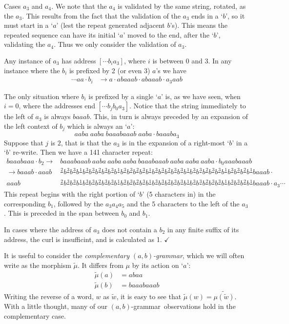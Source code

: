 \documentclass[11pt]{article}
\def\emph#1{{\em #1\/}}
\def\term#1{\emph{#1}}
\def\QED{$\checkmark$}
\def\ni{\noindent}
\def\s#1{\frac{#1}{}}
\def\ab{$(a,b)$}
\def\abg{\ab-grammar}
\def\rmu{\tilde{\mu}}
\def\q#1{`$#1$'}
\def\addr#1{$[#1]$}
\begin{document}
Cases $a_3$ and $a_4$. We note that the $a_4$ is validated by the same string, rotated, as the $a_3$.
This results from the fact that the validation of the $a_3$ ends in a \q{b}, so
it must start in a \q{a} (lest the repeat generated adjacent $b$'s).  This means
the repeated sequence can have its initial \q{a} moved to the end, after the
\q{b}, validating the $a_4$.  Thus we only consider the validation of $a_3$.

Any instance of $a_3$ has address \addr{\cdots b_ia_3}, where $i$ is between 0 and 3.  In any instance
where the $b_i$ is prefixed by 2 (or even 3) $a$'s we have
\begin{align*}
 \cdots aa\cdot b_i&\rightarrow a\cdot abaaab\cdot abaaab\cdot a_3aab
\end{align*}

The only situation where $b_i$ is prefixed by a single \q{a} is, as we have
seen, when $i=0$, where the addresses end \addr{\cdots b_jb_0a_3}.  Notice that the
string immediately to the left of $a_3$ is always $baaab$.  This, in turn is
always preceded by an expansion of the left context of $b_j$ which is always
an \q{a}:
$$aaba\;aaba\;baaabaaab\;aaba\cdot baaaba_3$$ Suppose that $j$ is $2$, that is
that the $a_3$ is in the expansion of a right-most \q{b} in a \q{b} re-write.
Then we have a 141 character repeat:
\begin{align*}
baaabaaa\cdot b_2\rightarrow{} & baaabaaab~aaba~aaba~aaba~baaabaaab~aaba~aaba~aaba\cdot b_0aaabaaab\\
\rightarrow baaab\cdot{}aaab&\s{2}b\s{3}b\s{3}b\s{1}b\s{3}b\s{3}b\s{2}b\s{3}b\s{3}b\s{1}b\s{3}b\s{3}b\s{2}b\s{3}b\s{1}b\s{3}b\s{3}b\s{2}b\s{3}b\s{3}b\s{1}b\s{3}b\s{3}b\s{2}b\s{3}b\s{3}b\s{1}b\s{3}b\s{3}b\s{2}b\s{1}baaab\cdot\\
  aaab&\s{2}b\s{3}b\s{3}b\s{1}b\s{3}b\s{3}b\s{2}b\s{3}b\s{3}b\s{1}b\s{3}b\s{3}b\s{2}b\s{3}b\s{1}b\s{3}b\s{3}b\s{2}b\s{3}b\s{3}b\s{1}b\s{3}b\s{3}b\s{2}b\s{3}b\s{3}b\s{1}b\s{3}b\s{3}b\s{2}b\s{1}baaab\cdot a_3\cdots
\end{align*}
\ni This repeat begins with the right portion of \q{b} (5
characters in) in the corresponding $b_1$, followed by the $a_3a_4a_5$ and the
5 characters to the left of the $a_3$.  This is preceded in the span between
$b_0$ and $b_1$.

In cases where the address of $a_3$ does not contain a $b_2$ in any finite
suffix of its address, the curl is insufficint, and is calculated as 1.
\QED

It is useful to consider the \term{complementary \abg}, 
which we will often write as the morphism $\rmu$. It differs from $\mu$ by
its action on \q{a}:
\begin{align*}
\rmu(a)&=abaa\\
\rmu(b)&=baaabaaab
\end{align*}
\ni Writing the reverse of a word, $w$ as $\tilde{w}$, it is easy to see
that $\rmu(w)=\widetilde{\mu(\tilde{w})}$.  With a little thought, many of
our \abg\ observations hold in the complementary case.
\end{document}
